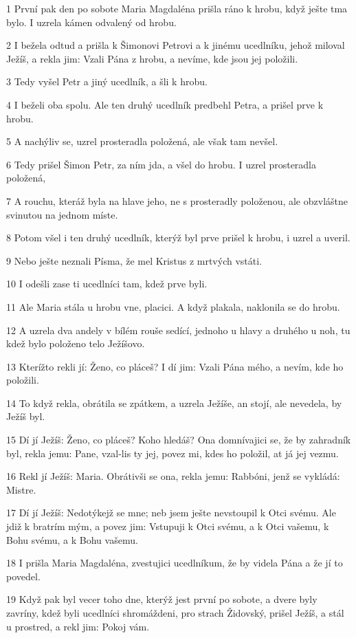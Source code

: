 \par 1 První pak den po sobote Maria Magdaléna prišla ráno k hrobu, když ješte tma bylo. I uzrela kámen odvalený od hrobu.
\par 2 I bežela odtud a prišla k Šimonovi Petrovi a k jinému ucedlníku, jehož miloval Ježíš, a rekla jim: Vzali Pána z hrobu, a nevíme, kde jsou jej položili.
\par 3 Tedy vyšel Petr a jiný ucedlník, a šli k hrobu.
\par 4 I beželi oba spolu. Ale ten druhý ucedlník predbehl Petra, a prišel prve k hrobu.
\par 5 A nachýliv se, uzrel prosteradla položená, ale však tam nevšel.
\par 6 Tedy prišel Šimon Petr, za ním jda, a všel do hrobu. I uzrel prosteradla položená,
\par 7 A rouchu, kteráž byla na hlave jeho, ne s prosteradly položenou, ale obzvláštne svinutou na jednom míste.
\par 8 Potom všel i ten druhý ucedlník, kterýž byl prve prišel k hrobu, i uzrel a uveril.
\par 9 Nebo ješte neznali Písma, že mel Kristus z mrtvých vstáti.
\par 10 I odešli zase ti ucedlníci tam, kdež prve byli.
\par 11 Ale Maria stála u hrobu vne, placici. A když plakala, naklonila se do hrobu.
\par 12 A uzrela dva andely v bílém rouše sedící, jednoho u hlavy a druhého u noh, tu kdež bylo položeno telo Ježíšovo.
\par 13 Kterížto rekli jí: Ženo, co pláceš? I dí jim: Vzali Pána mého, a nevím, kde ho položili.
\par 14 To když rekla, obrátila se zpátkem, a uzrela Ježíše, an stojí, ale nevedela, by Ježíš byl.
\par 15 Dí jí Ježíš: Ženo, co pláceš? Koho hledáš? Ona domnívajici se, že by zahradník byl, rekla jemu: Pane, vzal-lis ty jej, povez mi, kdes ho položil, at já jej vezmu.
\par 16 Rekl jí Ježíš: Maria. Obrátivši se ona, rekla jemu: Rabbóni, jenž se vykládá: Mistre.
\par 17 Dí jí Ježíš: Nedotýkejž se mne; neb jsem ješte nevstoupil k Otci svému. Ale jdiž k bratrím mým, a povez jim: Vstupuji k Otci svému, a k Otci vašemu, k Bohu svému, a k Bohu vašemu.
\par 18 I prišla Maria Magdaléna, zvestujici ucedlníkum, že by videla Pána a že jí to povedel.
\par 19 Když pak byl vecer toho dne, kterýž jest první po sobote, a dvere byly zavríny, kdež byli ucedlníci shromáždeni, pro strach Židovský, prišel Ježíš, a stál u prostred, a rekl jim: Pokoj vám.
